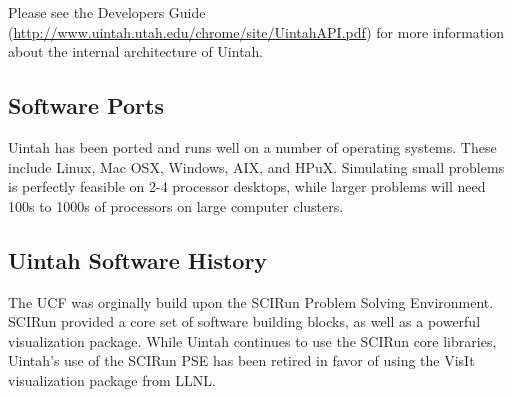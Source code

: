 Please see the Developers Guide
(\url{http://www.uintah.utah.edu/chrome/site/UintahAPI.pdf}) for more
information about the internal architecture of Uintah.

\subsection{Software Ports}

Uintah has been ported and runs well on a number of operating
systems.  These include Linux, Mac OSX, Windows, AIX, and HPuX. Simulating
small problems is perfectly feasible on 2-4 processor desktops, while
larger problems will need 100s to 1000s of processors on large
computer clusters. 

\subsection{Uintah Software History}

The UCF was orginally build upon the SCIRun Problem Solving
Environment.  SCIRun provided a core set of software building blocks,
as well as a powerful visualization package.  While Uintah continues
to use the SCIRun core libraries, Uintah's use of the SCIRun PSE has
been retired in favor of using the VisIt visualization package from
LLNL.

